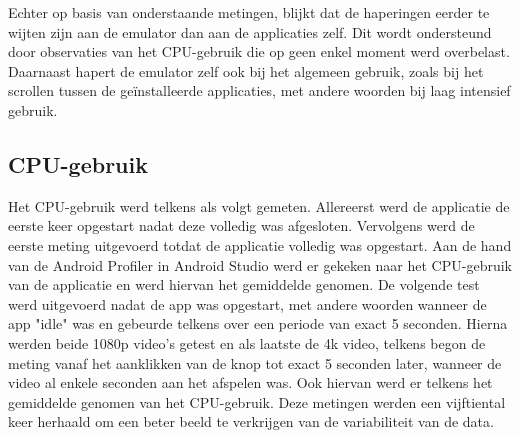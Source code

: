 Echter op basis van onderstaande metingen, blijkt dat de haperingen eerder te wijten zijn aan de emulator dan aan de applicaties zelf. Dit wordt ondersteund door observaties van het CPU-gebruik die op geen enkel moment werd overbelast. Daarnaast hapert de emulator zelf ook bij het algemeen gebruik, zoals bij het scrollen tussen de geïnstalleerde applicaties, met andere woorden bij laag intensief gebruik.


\subsection{CPU-gebruik}
\label{subsec:cpu-gebruik}

Het CPU-gebruik werd telkens als volgt gemeten. Allereerst werd de applicatie de eerste keer opgestart nadat deze volledig was afgesloten. Vervolgens werd de eerste meting uitgevoerd totdat de applicatie volledig was opgestart. Aan de hand van de Android Profiler in Android Studio werd er gekeken naar het CPU-gebruik van de applicatie en werd hiervan het gemiddelde genomen. De volgende test werd uitgevoerd nadat de app was opgestart, met andere woorden wanneer de app "idle" was en gebeurde telkens over een periode van exact 5 seconden. Hierna werden beide 1080p video's getest en als laatste de 4k video, telkens begon de meting vanaf het aanklikken van de knop tot exact 5 seconden later, wanneer de video al enkele seconden aan het afspelen was. Ook hiervan werd er telkens het gemiddelde genomen van het CPU-gebruik. Deze metingen werden een vijftiental keer herhaald om een beter beeld te verkrijgen van de variabiliteit van de data.




